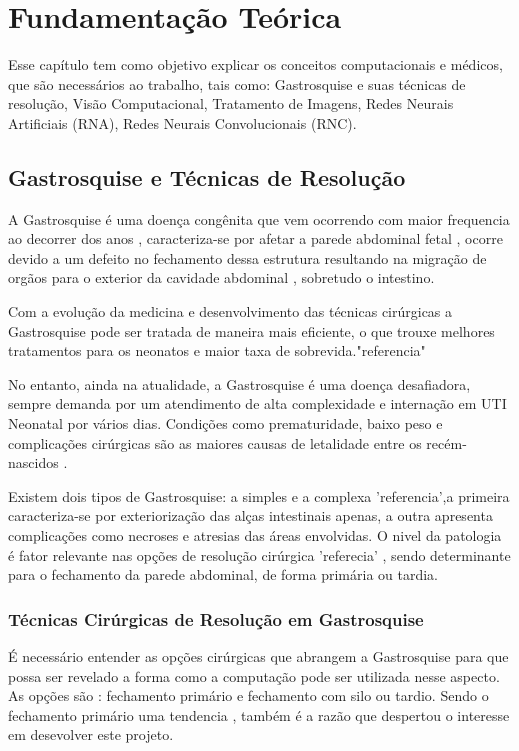 
\chapter{Fundamentação Teórica}



Esse capítulo tem como objetivo explicar os conceitos computacionais e médicos, que são necessários ao trabalho, tais como: Gastrosquise e suas técnicas de resolução, Visão Computacional, Tratamento de Imagens, Redes Neurais Artificiais (RNA), Redes Neurais Convolucionais (RNC).

\section{Gastrosquise e Técnicas de Resolução}

A Gastrosquise é uma doença congênita que vem ocorrendo com maior frequencia ao decorrer dos anos
\cite{Gastroschisis}  , caracteriza-se por afetar a parede abdominal fetal , ocorre devido a um defeito no fechamento dessa estrutura resultando na  migração de orgãos para o exterior da cavidade abdominal
\cite{ledbetter}
, sobretudo o intestino. 

Com  a evolução da medicina  e desenvolvimento das técnicas cirúrgicas a Gastrosquise pode ser tratada de maneira mais eficiente, o que trouxe melhores tratamentos para os neonatos e maior taxa de sobrevida."referencia" 


No entanto, ainda na atualidade, a Gastrosquise é uma doença desafiadora, sempre demanda por um atendimento de alta complexidade e internação em UTI Neonatal por vários dias. Condições como prematuridade, baixo peso e complicações cirúrgicas são as maiores causas de letalidade entre os recém-nascidos \cite{artigo_principal}.

Existem dois tipos de Gastrosquise: a simples e a complexa 'referencia',a primeira caracteriza-se por exteriorização das alças intestinais apenas, a outra apresenta complicações como necroses e atresias das áreas envolvidas. O  nivel da patologia é fator relevante nas opções de resolução cirúrgica 'referecia'  , sendo determinante para o fechamento da parede abdominal, de forma primária ou tardia.

\newpage
\subsection{Técnicas Cirúrgicas de Resolução em Gastrosquise}
É necessário entender as opções cirúrgicas que abrangem a Gastrosquise para que possa ser revelado a forma como a computação pode ser utilizada nesse aspecto. As opções são : fechamento primário e fechamento com silo ou tardio. Sendo o fechamento primário uma tendencia , também é a  razão que despertou o interesse em desevolver este projeto.

